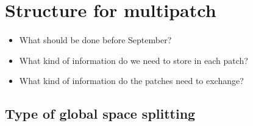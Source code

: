 \documentclass[presentation.tex]{subfiles}
\begin{document}
\maketitle


\section{Structure for multipatch}
\paragraph{}
\begin{itemize}
	\item What should be done before September?
	\item What kind of information do we need to store in each patch? 
	\item What kind of information do the patches need to exchange? 
\end{itemize}


\subsection{Type of global space splitting}
\paragraph{}
\end{document}
